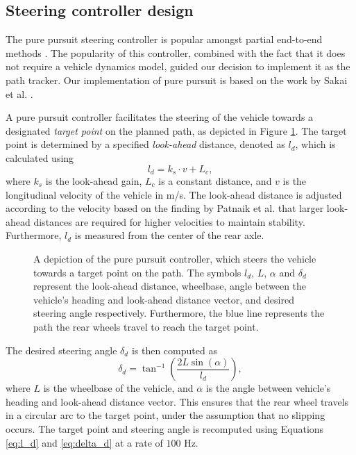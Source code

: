 \subsection{Steering controller design}

The pure pursuit steering controller is popular amongst partial end-to-end methods \cite{Evans2021b, Weiss2020}.
The popularity of this controller, combined with the fact that it does not require a vehicle dynamics model, guided our decision to implement it as the path tracker.
Our implementation of pure pursuit is based on the work by Sakai et al. \cite{Sakai2018}.


A pure pursuit controller facilitates the steering of the vehicle towards a designated \emph{target point} on the planned path, as depicted in Figure \ref{fig:pure_pursuit}. 
The target point is determined by a specified \emph{look-ahead} distance, denoted as $l_d$, which is calculated using
\begin{equation}\label{eq:l_d}
    l_d = k_s \cdot v + L_{c},
\end{equation}
where $k_s$ is the look-ahead gain, $L_{c}$ is a constant distance, and $v$ is the longitudinal velocity of the vehicle in m/s. 
The look-ahead distance is adjusted according to the velocity based on the finding by Patnaik et al. \cite{Patnaik2020} that larger look-ahead distances are required for higher velocities to maintain stability.
Furthermore, $l_d$ is measured from the center of the rear axle.

\begin{figure}[htb!]
    \centering
    
    \caption[A depiction of the pure pursuit controller]{A depiction of the pure pursuit controller, which steers the vehicle towards a target point on the path. The symbols $l_d$, $L$, $\alpha$ and $\delta_{d}$ represent the look-ahead distance, wheelbase, angle between the vehicle's heading and look-ahead distance vector, and desired steering angle respectively. Furthermore, the blue line represents the path the rear wheels travel to reach the target point.}
    \label{fig:pure_pursuit}
\end{figure}

The desired steering angle $\delta_d$ is then computed as
\begin{equation}\label{eq:delta_d}
    \delta_d = \tan^{-1} \left( \frac{2L\sin(\alpha)}{l_d} \right),
\end{equation}
where $L$ is the wheelbase of the vehicle, and $\alpha$ is the angle between vehicle's heading and look-ahead distance vector.
This ensures that the rear wheel travels in a circular arc to the target point, under the assumption that no slipping occurs. 
The target point and steering angle is recomputed using Equations \ref{eq:l_d} and \ref{eq:delta_d} at a rate of $100$ Hz.










